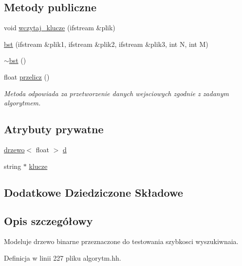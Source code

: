 \subsection*{Metody publiczne}
\begin{DoxyCompactItemize}
\item 
void \hyperlink{classbst_ac1ed9851250160995112e06c9af324aa}{wczytaj\-\_\-klucze} (ifstream \&plik)
\item 
\hyperlink{classbst_a3f7f0a490dae2027ad55151d40db770a}{bst} (ifstream \&plik1, ifstream \&plik2, ifstream \&plik3, int N, int M)
\item 
\hyperlink{classbst_a4755b663e678f2207dc32caccb5bb18d}{$\sim$bst} ()
\item 
float \hyperlink{classbst_a7991c5cd90a0d350a3150b31aab9401c}{przelicz} ()
\begin{DoxyCompactList}\small\item\em Metoda odpowiada za przetworzenie danych wejsciowych zgodnie z zadanym algorytmem. \end{DoxyCompactList}\end{DoxyCompactItemize}
\subsection*{Atrybuty prywatne}
\begin{DoxyCompactItemize}
\item 
\hyperlink{classdrzewo}{drzewo}$<$ float $>$ \hyperlink{classbst_a50ee6ca023b4ca0484157ccd8716fd37}{d}
\item 
string $\ast$ \hyperlink{classbst_a7e0cb2caf584c2de1d5ba767731c9c3a}{klucze}
\end{DoxyCompactItemize}
\subsection*{Dodatkowe Dziedziczone Składowe}


\subsection{Opis szczegółowy}
Modeluje drzewo binarne przeznaczone do testowania szybkosci wyszukiwnaia. 

Definicja w linii 227 pliku algorytm.\-hh.



